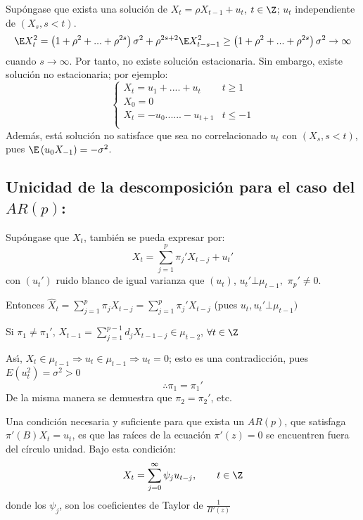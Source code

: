 \begin{itemize}
	Sup\'{o}ngase que exista una soluci\'{o}n de $X_{t} =\rho X_{t-1} +u_{t} $, $t\in \Z$; $u_{t} $ independiente de $\left( {X_{s} ,s<t} \right)$.
	\[
	 \E X_{t}^{2} =\left( {1+\rho^{2}+...+\rho^{2s}} \right)\sigma^{2}+\rho ^{2s+2}\E X_{t-s-1}^{2} \ge \left( {1+\rho^{2}+...+\rho^{2s}} \right)\sigma^{2}\to \infty
	\]
	cuando $s\to \infty $. Por tanto, no existe soluci\'{o}n estacionaria. Sin embargo, existe soluci\'{o}n no estacionaria; por ejemplo:
	\[
		\begin{cases}
			 X_{t} =u_{1} +....+u_{t} & t\ge 1 \\ 
			 X_{0} =0 \\ 
			 X_{t} =-u_{0} ......-u_{t+1} & t\le -1 \\ 
		\end{cases}
	\]
	Adem\'{a}s, est\'{a} soluci\'{o}n no satisface que sea no correlacionado $u_{t} $ con $(X_{s}, s<t)$, pues $\E\left( {u_{0} X_{-1} } \right)=-\sigma^{2}$.
\end{itemize}

\subsection{Unicidad de la descomposici\'{o}n para el caso del $AR(p)$:}

Sup\'{o}ngase que $X_{t}$, tambi\'{e}n se pueda expresar por:
\[
X_{t} =\sum_{j=1}^p {\pi_{j}' X_{t-j} +u_{t}' } 
\]
con $(u_{t}' )$ ruido blanco de igual varianza que $(u_{t} )$, $u_{t}' \bot \mu_{t-1},$ $\pi_{p}' \ne 0$.\newline 

Entonces $\widehat{{X}}_{t} =\sum_{j=1}^p {\pi_{j} X_{t-j} } =\sum_{j=1}^p {\pi_{j}' X_{t-j} } $ (pues $u_{t} ,u_{t}' \bot \mu_{t-1} )$\newline

Si $\pi_{1} \ne \pi_{1}'$, $X_{t-1} =\sum_{j=1}^{p-1} {d_{j} X_{t-1-j} \in \mu_{t-2} }$, $\forall t\in \Z$\newline

As\'{\i}, $X_{t} \in \mu_{t-1} \Rightarrow u_{t} \in \mu_{t-1} \Rightarrow u_{t} =0$; esto es una contradicci\'{o}n, pues $E\left( {u_{t}^{2} } \right)=\sigma^{2}>0$ 
\[
\therefore\pi_{1} =\pi_{1}' 
\]
De la misma manera se demuestra que $\pi_{2} =\pi_{2}'$, etc.

\begin{teorema}
Una condici\'{o}n necesaria y suficiente para que exista un $AR(p)$, que satisfaga $\pi'( B)X_{t} =u_{t} $, es que las ra\'{i}ces de la ecuaci\'{o}n $\pi'( z )=0$ se encuentren fuera del c\'{i}rculo unidad. Bajo esta condici\'{o}n:
\[
X_{t} =\sum_{j=0}^\infty {\psi_{j} u_{t-j} } ,
\qquad
t\in \Z
\]
donde los $\psi_{j} $, son los coeficientes de Taylor de $\frac{1}{\Pi'\left( z \right)}$
\end{teorema}

